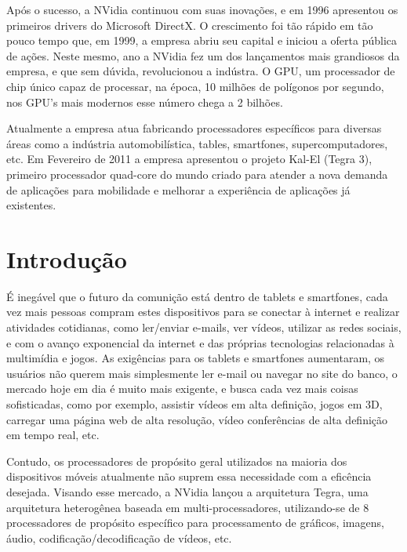 \documentclass[article]{IEEEtran}
\begin{document}
Ap\'os o sucesso, a NVidia continuou com suas inova\c{c}\~oes, e em 1996 apresentou os primeiros drivers do Microsoft DirectX.
O crescimento foi t\~ao r\'apido em t\~ao pouco tempo que, em 1999, a empresa abriu seu capital e iniciou a oferta p\'ublica de a\c{c}\~oes. Neste mesmo, ano a NVidia fez um dos lan\c{c}amentos mais grandiosos da empresa, e que sem d\'uvida, revolucionou a ind\'ustra. O GPU, um processador de chip \'unico capaz de processar, na \'epoca, 10 milh\~oes de pol\'igonos por segundo, nos GPU’s mais modernos esse n\'umero chega a 2 bilh\~oes.

Atualmente a empresa atua fabricando processadores espec\'ificos para diversas \'areas como a ind\'ustria automobil\'istica, tables, smartfones, supercomputadores, etc.
Em Fevereiro de  2011 a empresa apresentou o projeto Kal-El (Tegra 3), primeiro processador quad-core do mundo criado para atender a nova demanda de aplica\c{c}\~oes para mobilidade  e melhorar a experi\^encia de aplica\c{c}\~oes j\'a existentes.

\section{Introdu\c{c}\~ao}

\'E ineg\'avel que o futuro da comuni\c{c}\~ao est\'a dentro de tablets e smartfones, cada vez mais pessoas compram estes dispositivos para se conectar à internet e realizar atividades cotidianas, como ler/enviar e-mails, ver v\'ideos, utilizar as redes sociais, e com o avan\c{c}o exponencial da internet e das pr\'oprias tecnologias relacionadas \`a multim\'idia e jogos. As exig\^encias para os tablets e smartfones aumentaram, os usu\'arios n\~ao querem mais simplesmente ler e-mail ou navegar no site do banco, o mercado hoje em dia \'e muito mais exigente, e busca cada vez mais coisas sofisticadas, como por exemplo, assistir v\'ideos em alta defini\c{c}\~ao, jogos em 3D, carregar uma p\'agina web de alta resolu\c{c}\~ao, v\'ideo confer\^encias de alta defini\c{c}\~ao em tempo real, etc.

Contudo, os processadores de prop\'osito geral utilizados na maioria dos dispositivos m\'oveis atualmente n\~ao suprem essa necessidade com a efic\^encia desejada. Visando esse mercado, a NVidia lan\c{c}ou a arquitetura Tegra, uma arquitetura heterog\^enea baseada em multi-processadores, utilizando-se de 8 processadores de prop\'osito espec\'ifico para processamento de gr\'aficos, imagens, \'audio, codifica\c{c}\~ao/decodifica\c{c}\~ao de v\'ideos, etc.
\end{document}
